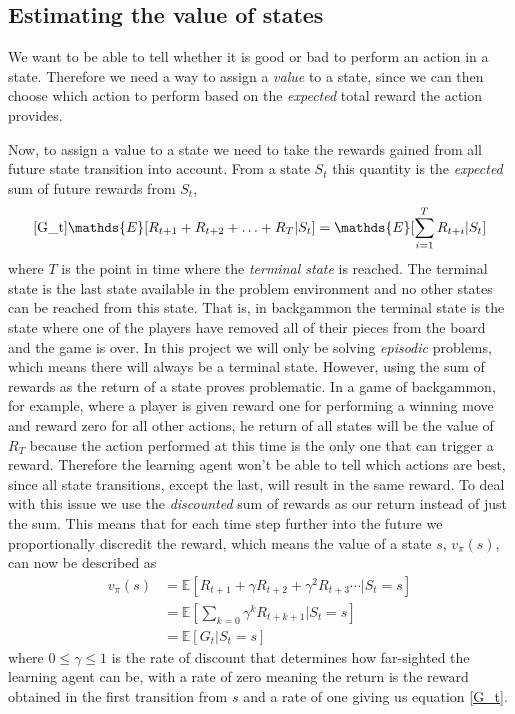 \documentclass[11pt]{article}
\begin{document}
\maketitle


\subsection{Estimating the value of states}\label{est_vals}

We want to be able to tell whether it is good or bad to
perform an action in a state.
Therefore we need a way to assign a \textit{value} to a state,
since we can then choose which action to perform
based on the \textit{expected} total reward the action provides.

Now, to assign a value to a state we need to take the rewards
gained from all future state transition into account.
From a state $S_t$ this quantity is the \textit{expected} sum of
future rewards from $S_t$,
\begin{equation}\ref{G_t}
    \mathds{E}[R_{t+1} + R_{t+2} + \hdots + R_{T} | S_t] = \mathds{E}[\sum\limits_{i = 1}^T R_{t+i} | S_t]
\end{equation}
where $T$ is the point in time where the \textit{terminal state} is reached.
The terminal state is the last state available in the problem environment and
no other states can be reached from this state.
That is, in backgammon the terminal state is the state where one of the players
have removed all of their pieces from the board and the game is over.
In this project we will only be solving \textit{episodic} problems, which
means there will always be a terminal state.
However, using the sum of rewards as the return of a state proves problematic.
In a game of backgammon, for example, where a player is given reward one for performing a winning move
and reward zero for all other actions, he return of all states will be
the value of $R_T$ because the action performed at this time is the only one
that can trigger a reward.
Therefore the learning agent won't be able to tell which actions are best,
since all state transitions, except the last, will result in the same reward.
To deal with this issue we use the \textit{discounted} sum of rewards as our return instead
of just the sum.
This means that for each time step further into the future
we proportionally discredit the reward, which means the value
of a state $s$, $v_\pi(s)$, can now be described as
\begin{equation}\label{gammaG_t}
    \begin{aligned}
        v_\pi(s) &= \mathds{E}[R_{t+1} + \gamma R_{t+2} + \gamma^2 R_{t+3} \cdots | S_t = s]\\
        &= \mathds{E}[ \sum\limits_{k = 0} \gamma^k R_{t+k+1} | S_t = s]\\
        &= \mathds{E}[ G_t | S_t = s]
    \end{aligned}
\end{equation}
where $ 0 \leq \gamma \leq 1$ is the rate of discount that determines how far-sighted the learning agent can be,
with a rate of zero meaning the return is the reward obtained in the first transition from $s$ and a rate of
one giving us equation \ref{G_t}.
\end{document}
